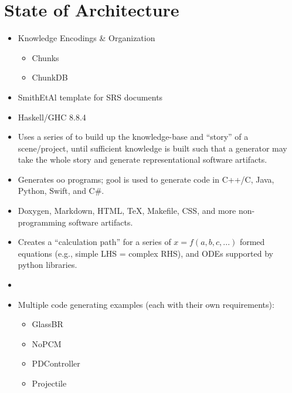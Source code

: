 \section{State of Architecture}

\begin{itemize}

      \item Knowledge Encodings \& Organization
            \begin{itemize}
                  \item Chunks
                  \item ChunkDB
            \end{itemize}

      \item SmithEtAl template for SRS documents

      \item Haskell/GHC 8.8.4

      \item Uses a series of  to build up the knowledge-base and
            ``story'' of a scene/project, until sufficient knowledge is built such
            that a generator may take the whole story and generate
            representational software artifacts.

      \item Generates \acs{oo} programs; \acs{gool} is used to generate code in
            C++/C, Java, Python, Swift, and C\#.

      \item Doxygen, Markdown, HTML, TeX, Makefile, CSS, and more non-programming
            software artifacts.

      \item Creates a ``calculation path'' for a series of $x = f(a,b,c,...)$
            formed equations (e.g., simple LHS = complex RHS), and ODEs supported
            by python libraries.

      \item {}

      \item Multiple code generating examples (each with their own requirements):
            \begin{itemize}
                  \item GlassBR
                  \item NoPCM
                  \item PDController
                  \item Projectile
            \end{itemize}


\end{itemize}
